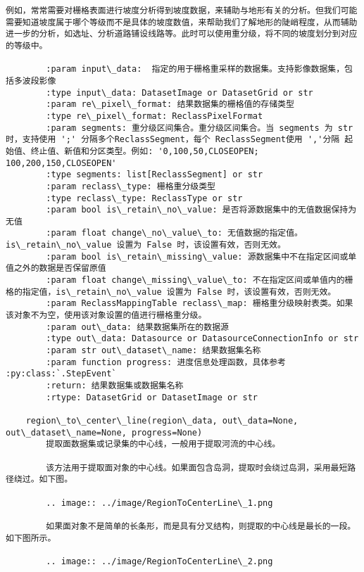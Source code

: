 \documentclass[11pt]{article}
\begin{document}
\begin{Verbatim}[commandchars=\\\{\}]
        例如，常常需要对栅格表面进行坡度分析得到坡度数据，来辅助与地形有关的分析。但我们可能需要知道坡度属于哪个等级而不是具体的坡度数值，来帮助我们了解地形的陡峭程度，从而辅助进一步的分析，如选址、分析道路铺设线路等。此时可以使用重分级，将不同的坡度划分到对应的等级中。
        
        :param input\_data:  指定的用于栅格重采样的数据集。支持影像数据集，包括多波段影像
        :type input\_data: DatasetImage or DatasetGrid or str
        :param re\_pixel\_format: 结果数据集的栅格值的存储类型
        :type re\_pixel\_format: ReclassPixelFormat
        :param segments: 重分级区间集合。重分级区间集合。当 segments 为 str 时，支持使用 ';' 分隔多个ReclassSegment，每个 ReclassSegment使用 ','分隔 起始值、终止值、新值和分区类型。例如: '0,100,50,CLOSEOPEN; 100,200,150,CLOSEOPEN'
        :type segments: list[ReclassSegment] or str
        :param reclass\_type: 栅格重分级类型
        :type reclass\_type: ReclassType or str
        :param bool is\_retain\_no\_value: 是否将源数据集中的无值数据保持为无值
        :param float change\_no\_value\_to: 无值数据的指定值。 is\_retain\_no\_value 设置为 False 时，该设置有效，否则无效。
        :param bool is\_retain\_missing\_value: 源数据集中不在指定区间或单值之外的数据是否保留原值
        :param float change\_missing\_value\_to: 不在指定区间或单值内的栅格的指定值，is\_retain\_no\_value 设置为 False 时，该设置有效，否则无效。
        :param ReclassMappingTable reclass\_map: 栅格重分级映射表类。如果该对象不为空，使用该对象设置的值进行栅格重分级。
        :param out\_data: 结果数据集所在的数据源
        :type out\_data: Datasource or DatasourceConnectionInfo or str
        :param str out\_dataset\_name: 结果数据集名称
        :param function progress: 进度信息处理函数，具体参考 :py:class:`.StepEvent`
        :return: 结果数据集或数据集名称
        :rtype: DatasetGrid or DatasetImage or str
    
    region\_to\_center\_line(region\_data, out\_data=None, out\_dataset\_name=None, progress=None)
        提取面数据集或记录集的中心线，一般用于提取河流的中心线。
        
        该方法用于提取面对象的中心线。如果面包含岛洞，提取时会绕过岛洞，采用最短路径绕过。如下图。
        
        .. image:: ../image/RegionToCenterLine\_1.png
        
        如果面对象不是简单的长条形，而是具有分叉结构，则提取的中心线是最长的一段。如下图所示。
        
        .. image:: ../image/RegionToCenterLine\_2.png
        

\end{Verbatim}
\end{document}
